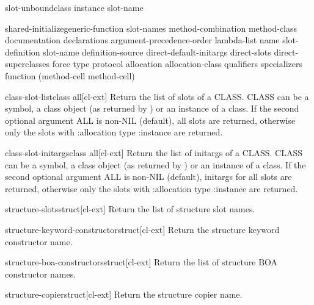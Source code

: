 \documentclass[10pt,english]{book}
\begin{document}
\begin{generic}{slot-unbound}{class instance slot-name}
  
\end{generic}

\begin{generic}{shared-initialize}{generic-function slot-names \key
    method-combination method-class documentation declarations
    argument-precedence-order lambda-list name slot-definition
    slot-name definition-source direct-default-initargs direct-slots
    direct-superclasses force type protocol allocation
    allocation-class qualifiers specializers function (method-cell
    method-cell) \akeys}
\end{generic}

\begin{function}{class-slot-list}{class \op all}[cl-ext]
  Return the list of slots of a CLASS. CLASS can be a symbol, a class
  object (as returned by ) or an instance of a class.
  If the second optional argument ALL is non-NIL (default), all slots
  are returned, otherwise only the slots with :allocation type
  :instance are returned.
\end{function}

\begin{function}{class-slot-initargs}{class \op all}[cl-ext]
  Return the list of initargs of a CLASS. CLASS can be a symbol, a
  class object (as returned by ) or an instance of a
  class. If the second optional argument ALL is non-NIL (default),
  initargs for all slots are returned, otherwise only the slots with
  :allocation type :instance are returned.
\end{function}

\begin{function}{structure-slots}{struct}[cl-ext]
  Return the list of structure slot names.
\end{function}

\begin{function}{structure-keyword-constructor}{struct}[cl-ext]
  Return the structure keyword constructor name.
\end{function}

\begin{function}{structure-boa-constructors}{struct}[cl-ext]
  Return the list of structure BOA constructor names.
\end{function}

\begin{function}{structure-copier}{struct}[cl-ext]
  Return the structure copier name.  
\end{function}
\end{document}
